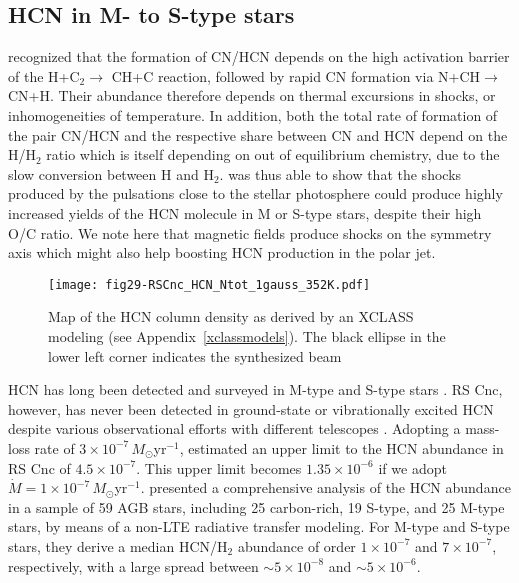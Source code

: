\documentclass{aa}
\begin{document}
\subsection{HCN in M- to S-type stars}\label{nontechemistrysec}

\citet{che2006} recognized that the formation of CN/HCN
depends on the high activation barrier of the H+C$_{2}\rightarrow$
CH+C reaction, followed by rapid CN formation via N+CH$\rightarrow$CN+H.
Their abundance therefore depends on thermal excursions in shocks,
or inhomogeneities of temperature. In addition, both the total rate
of formation of the pair CN/HCN and the respective share between CN
and HCN depend on the H/H$_{2}$ ratio which is itself depending on 
out of equilibrium chemistry, due to the slow conversion between H
and H$_{2}$. \citet{che2006} was thus able to show that
the shocks produced by the pulsations close to the stellar photosphere
could produce highly increased yields of the HCN molecule in M or
S-type stars, despite their high O/C ratio. We note here that magnetic
fields produce shocks on the symmetry axis which might also help boosting
HCN production in the polar jet.

\begin{figure}
  \centering
  \texttt{[image: fig29-RSCnc\_HCN\_Ntot\_1gauss\_352K.pdf]}
  \caption{Map of the HCN column density as derived by an XCLASS modeling 
    (see Appendix~\ref{xclassmodels}).
    The black ellipse in the lower left corner indicates the synthesized beam}
    \label{hcnncolfig}
\end{figure}

HCN has long been detected and surveyed in M-type and S-type stars
\citep[e.g.,][]{dg1985,lnow88,bfo94,olnw98,sroetal2013}. RS Cnc,
however, has never been detected in ground-state or vibrationally
excited HCN despite various observational efforts with different
telescopes
\citep{1988A&A...194..230L,sojnz89,1989A&A...210..225N,1992A&A...263..183L,bfo94,bl94,olnw98}.
Adopting a mass-loss rate of $3\times10^{-7}\,M_\odot$yr$^{-1}$,
\citet{bfo94} estimated an upper limit to the HCN abundance in RS Cnc
of $4.5\times10^{-7}$.  This upper limit  becomes $1.35\times10^{-6}$
if we adopt $\dot{M}=1\times10^{-7}\,M_\odot$yr$^{-1}$.
\citet{sroetal2013} presented a comprehensive analysis of the HCN
abundance in a sample of 59 AGB stars, including 25 carbon-rich, 19
S-type, and 25 M-type stars, by means of a non-LTE radiative transfer
modeling. For M-type and S-type stars, they derive  a median HCN/H$_2$
abundance of order $1\times10^{-7}$ and $7\times10^{-7}$,
respectively, with a large spread between $\sim 5\times 10^{-8}$ and
$\sim 5\times 10^{-6}$.
\end{document}
